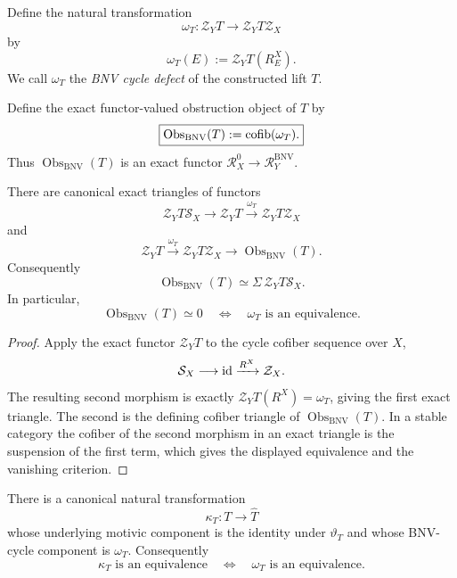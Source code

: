 \begin{definition}
\label{def:bn-diff-cycle-defect}
Define the natural transformation
\[
  \boxed{
  \omega_T:
  \mathcal Z_YT
  \longrightarrow
  \mathcal Z_YT\mathcal Z_X
  }
\]
by
\[
  \omega_T(E):=\mathcal Z_YT(R_E^X).
\]
We call \(\omega_T\) the \emph{BNV cycle defect} of the constructed lift
\(T\).
\end{definition}


\begin{definition}
\label{def:bn-diff-bnv-obstruction-object}
Define the exact functor-valued obstruction object of $T$ by
\[
    \boxed{
    \operatorname{Obs}_{\mathrm{BNV}}(T)
    :=
    \operatorname{cofib}(\omega_T).
    }
\]
Thus $\operatorname{Obs}_{\mathrm{BNV}}(T)$ is an exact functor
$\mathcal R_X^0\to\mathcal R_Y^{\mathrm{BNV}}$.
\end{definition}

\begin{proposition}
\label{prop:bn-diff-bnv-obstruction-object}
There are canonical exact triangles of functors
\[
    \mathcal Z_YT\mathcal S_X
    \longrightarrow
    \mathcal Z_YT
    \xrightarrow{\omega_T}
    \mathcal Z_YT\mathcal Z_X
\]
and
\[
    \mathcal Z_YT
    \xrightarrow{\omega_T}
    \mathcal Z_YT\mathcal Z_X
    \longrightarrow
    \operatorname{Obs}_{\mathrm{BNV}}(T).
\]
Consequently
\[
    \boxed{
    \operatorname{Obs}_{\mathrm{BNV}}(T)
    \simeq
    \Sigma\,\mathcal Z_YT\mathcal S_X.
    }
\]
In particular,
\[
    \operatorname{Obs}_{\mathrm{BNV}}(T)\simeq0
    \quad\Longleftrightarrow\quad
    \omega_T\text{ is an equivalence}.
\]
\end{proposition}

\begin{proof}
Apply the exact functor $\mathcal Z_YT$ to the cycle cofiber sequence over $X$,
\[
    \mathcal S_X
    \longrightarrow
    \operatorname{id}
    \xrightarrow{R^X}
    \mathcal Z_X.
\]
The resulting second morphism is exactly
$\mathcal Z_YT(R^X)=\omega_T$, giving the first exact triangle.  The second is
the defining cofiber triangle of $\operatorname{Obs}_{\mathrm{BNV}}(T)$.
In a stable category the cofiber of the second morphism in an exact triangle is
the suspension of the first term, which gives the displayed equivalence and
the vanishing criterion.
\end{proof}

\begin{theorem}
\label{thm:bn-diff-canonical-correction-comparison}
There is a canonical natural transformation
\[
  \boxed{
  \kappa_T:T\longrightarrow\widehat T
  }
\]
whose underlying motivic component is the identity under
\(\vartheta_T\) and whose BNV-cycle component is \(\omega_T\).  Consequently
\[
  \boxed{
  \kappa_T\text{ is an equivalence}
  \quad\Longleftrightarrow\quad
  \omega_T\text{ is an equivalence}.
  }
\]
\end{theorem}

